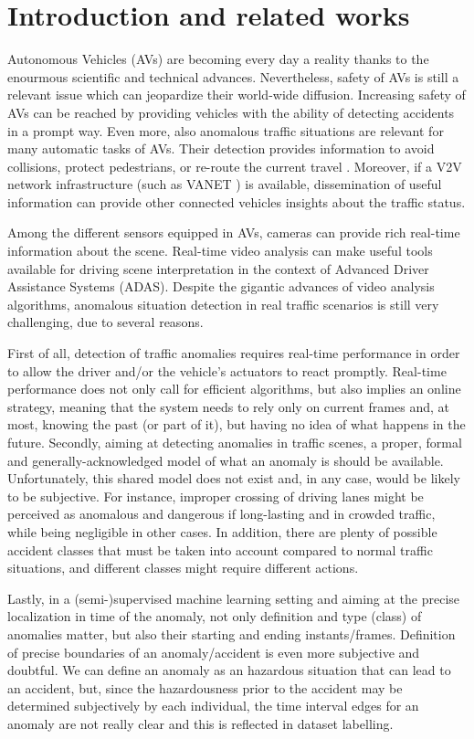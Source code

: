 \section{Introduction and related works}
Autonomous Vehicles (AVs) are becoming every day a reality thanks to the enourmous scientific and technical advances. Nevertheless, safety of AVs is still a relevant issue which can jeopardize their world-wide diffusion. Increasing safety of AVs can be reached by providing vehicles with the ability of detecting accidents in a prompt way. Even more, also anomalous traffic situations are relevant for many automatic tasks of AVs. Their detection provides information to avoid collisions, protect pedestrians, or re-route the current travel \cite{4298901}. Moreover, if a V2V network infrastructure (such as VANET \cite{fatemidokht2021efficient}) is available, dissemination of useful information can provide other connected vehicles insights about the traffic status. 

Among the different sensors equipped in AVs, cameras can provide rich real-time information about the scene. Real-time video analysis can make useful tools available for driving scene interpretation in the context of Advanced Driver Assistance Systems (ADAS). Despite the gigantic advances of video analysis algorithms, anomalous situation detection in real traffic scenarios is still very challenging, due to several reasons.

First of all, detection of traffic anomalies requires real-time performance in order to allow the driver and/or the vehicle's actuators to react promptly. Real-time performance does not only call for efficient algorithms, but also implies an online strategy, meaning that the system needs to rely only on current frames and, at most, knowing the past (or part of it), but having no idea of what happens in the future. Secondly, aiming at detecting anomalies in traffic scenes, a proper, formal and generally-acknowledged model of what an anomaly is should be available. Unfortunately, this shared model does not exist and, in any case, would be likely to be subjective. For instance, improper crossing of driving lanes might be perceived as anomalous and dangerous if long-lasting and in crowded traffic, while being negligible in other cases. In addition, there are plenty of possible accident classes that must be taken into account compared to normal traffic situations, and different classes might require different actions.

Lastly, in a (semi-)supervised machine learning setting and aiming at the precise localization in time of the anomaly, not only definition and type (class) of anomalies matter, but also their starting and ending instants/frames. Definition of precise boundaries of an anomaly/accident is even more subjective and doubtful. We can define an anomaly as an hazardous situation that can lead to an accident, but, since the hazardousness prior to the accident may be determined subjectively by each individual, the time interval edges for an anomaly are not really clear and this is reflected in dataset labelling.

